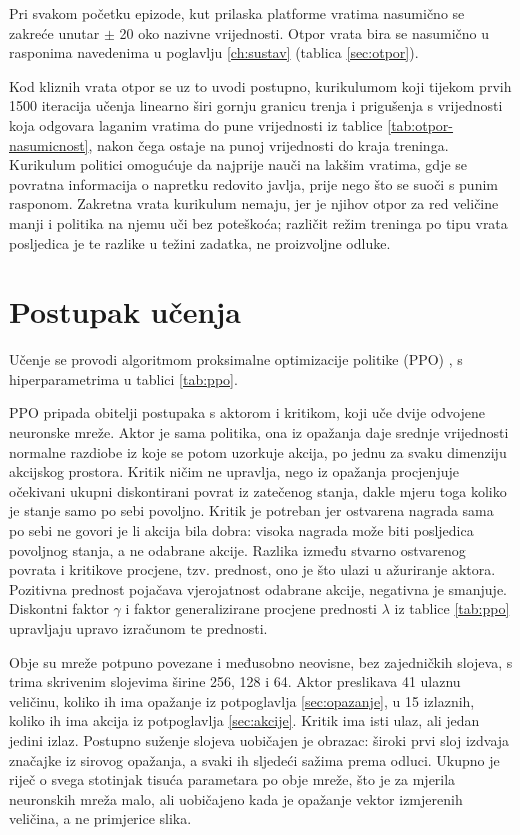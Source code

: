 Pri svakom početku epizode, kut prilaska platforme vratima nasumično se zakreće unutar $\pm$ 20\textdegree{}
oko nazivne vrijednosti. Otpor vrata bira se nasumično u rasponima navedenima u poglavlju
\ref{ch:sustav} (tablica \ref{sec:otpor}).

Kod kliznih vrata otpor se uz to uvodi postupno, kurikulumom koji tijekom prvih 1500 iteracija
učenja linearno širi gornju granicu trenja i prigušenja s vrijednosti koja odgovara laganim
vratima do pune vrijednosti iz tablice \ref{tab:otpor-nasumicnost}, nakon čega ostaje na punoj
vrijednosti do kraja treninga. Kurikulum politici omogućuje da najprije nauči na lakšim vratima, gdje
se povratna informacija o napretku redovito javlja, prije nego što se suoči s punim rasponom.
Zakretna vrata kurikulum nemaju, jer je njihov otpor za red veličine manji i politika na njemu
uči bez poteškoća; različit režim treninga po tipu vrata posljedica je te razlike u težini
zadatka, ne proizvoljne odluke.

\section{Postupak učenja}
\label{sec:trening}

Učenje se provodi algoritmom proksimalne optimizacije politike (PPO) \cite{schulman2017ppo}, s
hiperparametrima u tablici \ref{tab:ppo}.

PPO pripada obitelji postupaka s aktorom i kritikom, koji uče dvije odvojene neuronske mreže.
Aktor je sama politika, ona iz opažanja daje srednje vrijednosti normalne razdiobe iz koje se potom
uzorkuje akcija, po jednu za svaku dimenziju akcijskog prostora. Kritik ničim ne upravlja, nego
iz opažanja procjenjuje očekivani ukupni diskontirani povrat iz
zatečenog stanja, dakle mjeru toga koliko je stanje samo po sebi povoljno. Kritik je potreban
jer ostvarena nagrada sama po sebi ne govori je li akcija bila dobra: visoka nagrada može biti
posljedica povoljnog stanja, a ne odabrane akcije. Razlika između stvarno ostvarenog povrata i
kritikove procjene, tzv. prednost, ono je što ulazi u ažuriranje aktora. Pozitivna
prednost pojačava vjerojatnost odabrane akcije, negativna je smanjuje. Diskontni faktor $\gamma$
i faktor generalizirane procjene prednosti $\lambda$ iz tablice \ref{tab:ppo} upravljaju upravo
izračunom te prednosti.

Obje su mreže potpuno povezane i međusobno neovisne, bez zajedničkih slojeva, s trima skrivenim
slojevima širine 256, 128 i 64. Aktor preslikava 41 ulaznu veličinu, koliko ih ima opažanje iz
potpoglavlja \ref{sec:opazanje}, u 15 izlaznih, koliko ih ima akcija iz potpoglavlja
\ref{sec:akcije}. Kritik ima isti ulaz, ali jedan jedini izlaz. Postupno suženje slojeva
uobičajen je obrazac: široki prvi sloj izdvaja značajke iz sirovog opažanja, a svaki ih sljedeći
sažima prema odluci. Ukupno je riječ o svega stotinjak tisuća parametara po obje mreže, što je
za mjerila neuronskih mreža malo, ali uobičajeno kada je opažanje vektor izmjerenih veličina, a
ne primjerice slika.

